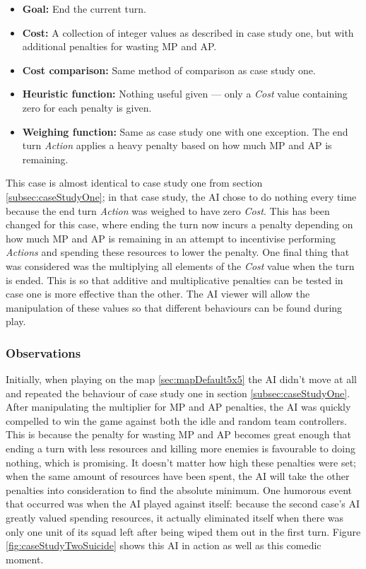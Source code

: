 \documentclass[11pt, a4paper]{report}
\begin{document}
\begin{itemize}
  \item \textbf{Goal:} End the current turn.
  \item \textbf{Cost:} A collection of integer values as described in case study one, but with additional penalties for wasting MP and AP.
  \item \textbf{Cost comparison:} Same method of comparison as case study one.
  \item \textbf{Heuristic function:} Nothing useful given --- only a \emph{Cost} value containing zero for each penalty is given.
  \item \textbf{Weighing function:} Same as case study one with one exception. The end turn \emph{Action} applies a heavy penalty based on how much MP and AP is remaining.
\end{itemize}

This case is almost identical to case study one from section \ref{subsec:caseStudyOne}; in that case study, the AI chose to do nothing every time because the end turn \emph{Action} was weighed to have zero \emph{Cost}. This has been changed for this case, where ending the turn now incurs a penalty depending on how much MP and AP is remaining in an attempt to incentivise performing \emph{Actions} and spending these resources to lower the penalty. One final thing that was considered was the multiplying all elements of the \emph{Cost} value when the turn is ended. This is so that additive and multiplicative penalties can be tested in case one is more effective than the other. The AI viewer will allow the manipulation of these values so that different behaviours can be found during play. 

\subsubsection{Observations}

Initially, when playing on the map \ref{sec:mapDefault5x5} the AI didn't move at all and repeated the behaviour of case study one in section \ref{subsec:caseStudyOne}. After manipulating the multiplier for MP and AP penalties, the AI was quickly compelled to win the game against both the idle and random team controllers. This is because the penalty for wasting MP and AP becomes great enough that ending a turn with less resources and killing more enemies is favourable to doing nothing, which is promising. It doesn't matter how high these penalties were set; when the same amount of resources have been spent, the AI will take the other penalties into consideration to find the absolute minimum. One humorous event that occurred was when the AI played against itself: because the second case's AI greatly valued spending resources, it actually eliminated itself when there was only one unit of its squad left after being wiped them out in the first turn. Figure \ref{fig:caseStudyTwoSuicide} shows this AI in action as well as this comedic moment.
\end{document}
